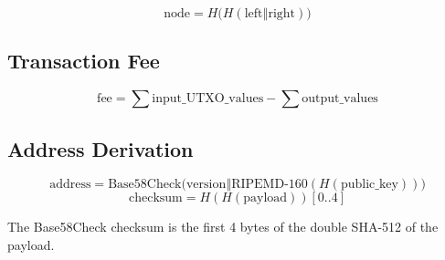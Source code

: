 \documentclass[11pt,a4paper]{article}
\begin{document}
\[
\text{node} = H\bigl(H(\text{left} \mathbin{\Vert} \text{right})\bigr)
\]

\subsection{Transaction Fee}

\[
\text{fee} = \sum \text{input\_UTXO\_values} - \sum \text{output\_values}
\]

\subsection{Address Derivation}

\[
\text{address} = \text{Base58Check}\bigl(\text{version} \mathbin{\Vert} \text{RIPEMD-160}(H(\text{public\_key}))\bigr)
\]
\[
\text{checksum} = H(H(\text{payload}))[0..4]
\]

The Base58Check checksum is the first 4 bytes of the double SHA-512 of the payload.
\end{document}
